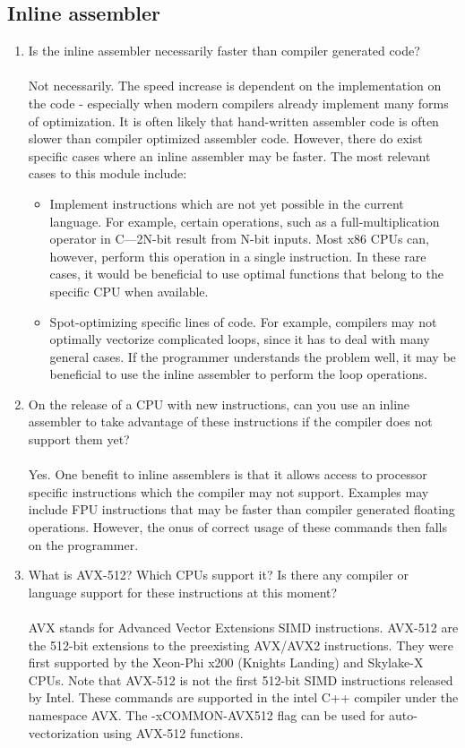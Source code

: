 \documentclass{article}
\begin{document}
\subsection{Inline assembler}
\begin{enumerate}
\item{Is the inline assembler necessarily faster than compiler generated code?}\\\\
Not necessarily. The speed increase is dependent on the implementation on the code - especially when modern compilers already implement many forms of optimization. It is often likely that hand-written assembler code is often slower than compiler optimized assembler code. However, there do exist specific cases where an inline assembler may be faster. The most relevant cases to this module include:
\begin{itemize}
\item{Implement instructions which are not yet possible in the current language. For example, certain operations, such as a full-multiplication operator in C---2N-bit result from N-bit inputs. Most x86 CPUs can, however, perform this operation in a single instruction. In these rare cases, it would be beneficial to use optimal functions that belong to the specific CPU when available.}
\item{Spot-optimizing specific lines of code. For example, compilers may not optimally vectorize complicated loops, since it has to deal with many general cases. If the programmer understands the problem well, it may be beneficial to use the inline assembler to perform the loop operations.}
\end{itemize}
\item{On the release of a CPU with new instructions, can you use an inline assembler to take advantage of these instructions if the compiler does not support them yet?}\\\\
Yes. One benefit to inline assemblers is that it allows access to processor specific instructions which the compiler may not support. Examples may include FPU instructions that may be faster than compiler generated floating operations. However, the onus of correct usage of these commands then falls on the programmer.
\item{What is AVX-512? Which CPUs support it? Is there any compiler or language support for these instructions at this moment?}\\\\
AVX stands for Advanced Vector Extensions SIMD instructions. AVX-512 are the 512-bit extensions to the preexisting AVX/AVX2 instructions. They were first supported by the Xeon-Phi x200 (Knights Landing) and Skylake-X CPUs. Note that AVX-512 is not the first 512-bit SIMD instructions released by Intel. These commands are supported in the intel C++ compiler under the namespace AVX. The -xCOMMON-AVX512 flag can be used for auto-vectorization using AVX-512 functions.

\end{enumerate}
\end{document}
